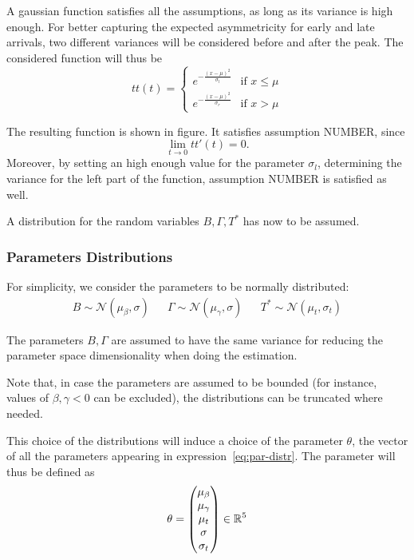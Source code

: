 A gaussian function satisfies all the assumptions,
as long as its variance is high enough.
For better capturing the expected asymmetricity for early and late arrivals,
two different variances will be considered before and after the peak.
The considered function will thus be
\begin{equation}
  \label{eq:tt_def}
  tt(t) =
  \begin{cases}
    e^{-\frac{(x - \mu)^2}{\sigma_l}} & \text{if } x \leq \mu \\
    e^{-\frac{(x - \mu)^2}{\sigma_r}} & \text{if } x > \mu
  \end{cases}
\end{equation}

The resulting function is shown in figure.
It satisfies assumption NUMBER,
since
\begin{equation*}
  \lim_{t \rightarrow 0}tt'(t) = 0.
\end{equation*}
Moreover, by setting an high enough value for the parameter \(\sigma_l\),
determining the variance for the left part of the function,
assumption NUMBER is satisfied as well.

A distribution for the random variables \(B, \Gamma, T^*\) has now to be assumed.

\subsubsection{Parameters Distributions}

For simplicity, we consider the parameters to be normally distributed:
\begin{align}
  \label{eq:par-distr}
  B \sim \mathcal{N}(\mu_\beta, \sigma) && \Gamma \sim \mathcal{N}(\mu_\gamma, \sigma) && T^* \sim \mathcal{N}(\mu_t, \sigma_t)
\end{align}

The parameters \(B, \Gamma\) are assumed to have the same variance for reducing the parameter space dimensionality when doing the estimation.

Note that, in case the parameters are assumed to be bounded
(for instance, values of \(\beta, \gamma < 0\) can be excluded),
the distributions can be truncated where needed.

This choice of the distributions will induce a choice of the parameter \(\theta\),
the vector of all the parameters appearing in expression~\eqref{eq:par-distr}.
The parameter will thus be defined as
\begin{equation*}
  \theta =
  \begin{pmatrix}
    \mu_\beta \\
    \mu_\gamma \\
    \mu_t \\
    \sigma \\
    \sigma_t
  \end{pmatrix}
  \in \mathbb{R}^5
\end{equation*}

